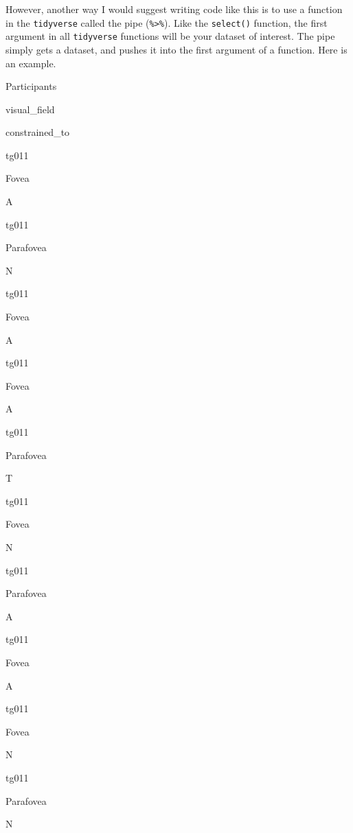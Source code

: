 \documentclass[
]{book}
\newenvironment{Shaded}{\begin{snugshade}}{\end{snugshade}}
\newcommand{\KeywordTok}[1]{\textcolor[rgb]{0.13,0.29,0.53}{\textbf{#1}}}
\newcommand{\NormalTok}[1]{#1}
\newcommand{\OperatorTok}[1]{\textcolor[rgb]{0.81,0.36,0.00}{\textbf{#1}}}
\newcommand{\StringTok}[1]{\textcolor[rgb]{0.31,0.60,0.02}{#1}}
\begin{document}
However, another way I would suggest writing code like this is to use a function in the \texttt{tidyverse} called the pipe (\texttt{\%\textgreater{}\%}). Like the \texttt{select()} function, the first argument in all \texttt{tidyverse} functions will be your dataset of interest. The pipe simply gets a dataset, and pushes it into the first argument of a function. Here is an example.

\begin{Shaded}
\end{Shaded}

Participants

visual\_field

constrained\_to

tg011

Fovea

A

tg011

Parafovea

N

tg011

Fovea

A

tg011

Fovea

A

tg011

Parafovea

T

tg011

Fovea

N

tg011

Parafovea

A

tg011

Fovea

A

tg011

Fovea

N

tg011

Parafovea

N
\end{document}

